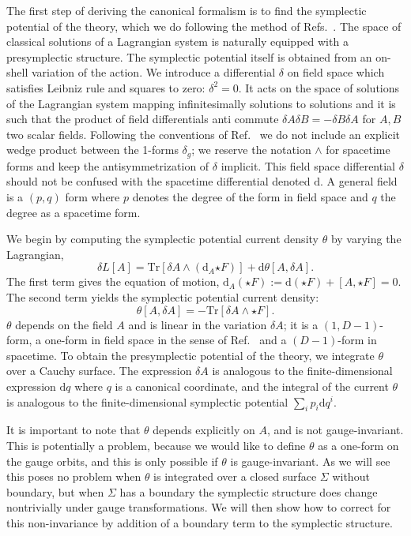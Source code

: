 \documentclass[a4paper,11pt]{article}
\newcommand{\be}{\begin{equation}}
\newcommand{\ee}{\end{equation}}
\def\rd{\mathrm{d}}
\newcommand{\Tr}{\mbox{Tr}}
\begin{document}
The first step of deriving the canonical formalism is to find the symplectic potential of the theory, which we do following the method of Refs.~\cite{Kijowski:1976ze,Crnkovic:1987tz, Crnkovic1987, Gawedzki:1990jc, Lee:1990nz}.
The space of classical solutions of a Lagrangian system is naturally equipped with a presymplectic structure. 
The symplectic potential itself is obtained from an on-shell variation of the action.
We introduce a differential $\delta$ on field space which satisfies Leibniz rule and squares to zero: $\delta^{2}=0$. 
It acts on the space of solutions of the Lagrangian system mapping infinitesimally solutions to solutions and it is such that the product of field differentials anti commute $\delta A \delta B= -\delta B\delta A$ for $A,B$ two scalar fields.
Following the conventions of Ref.~\cite{Crnkovic1987} we do not include an explicit wedge product between the 1-forms $\delta_g$; we reserve the notation $\wedge$ for spacetime forms and keep the antisymmetrization of $\delta$ implicit.
This field space differential $\delta$ should not be confused with the spacetime differential denoted $\rd$.
A general field is a $(p,q)$ form where $p$ denotes the degree of the form in field space and $q$ the degree as a spacetime form. 

We begin by computing the symplectic potential current density $\theta$ by varying the Lagrangian,
\begin{equation}
\delta L[A] = \Tr[  \delta A \wedge (\rd_A {\star F}) ] + \rd \theta[A,\delta A].
\end{equation}
The first term gives the equation of motion, $\rd_A (\star F) := \rd(\star F) + [A,{\star F}] = 0$. 
The second term yields the symplectic potential current density:
\be
\theta[A, \delta A] = -\Tr[  \delta A\wedge \star F ].
\ee
$\theta$ depends on the field $A$ and is linear in the variation $\delta A$; it is a $(1,D-1)$-form, a one-form in field space in the sense of Ref.~\cite{Crnkovic1987} and a $(D-1)$-form in spacetime.
To obtain the presymplectic potential of the theory, we integrate $\theta$ over a Cauchy surface.
The expression $\delta A$ is analogous to the finite-dimensional expression $\rd q$ where $q$ is a canonical coordinate, and the integral of the current $\theta$ is analogous to the finite-dimensional symplectic potential $\sum_i p_i \rd q^i$.

It is important to note that $\theta$ depends explicitly on $A$, and is not gauge-invariant.
This is potentially a problem, because we would like to define $\theta$ as a one-form on the gauge orbits, and this is only possible if $\theta$ is gauge-invariant.
As we will see this poses no problem when $\theta$ is integrated over a closed surface $\Sigma$ without boundary, but when $\Sigma$ has a boundary the symplectic structure does change nontrivially under gauge transformations.
We will then show how to correct for this non-invariance by addition of a boundary term to the symplectic structure.
\end{document}
